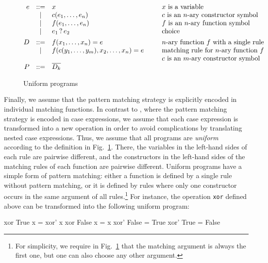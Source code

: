 \documentclass{llncs}
\newcommand{\code}[1]{\mbox{\small\texttt{#1}}}
\newcommand{\Choice}[2]{#1 \mathop{?} #2}
\newcommand{\ol}[1]{\overline{#1}}
\begin{document}
\begin{figure}[t]
\[
\begin{array}{@{}rcl@{~~~~~~~~}l}
  e & ::= & x & \mbox{$x$ is a variable}\\
    &  |  & c(e_1,\ldots,e_n) & \mbox{$c$ is an $n$-ary constructor symbol}\\
    &  |  & f(e_1,\ldots,e_n) & \mbox{$f$ is an $n$-ary function symbol}\\
    &  |  & \Choice{e_1}{e_2} & \mbox{choice} \\[1ex]
  D & ::= & f(x_1,\ldots,x_n) = e
                & \mbox{$n$-ary function $f$ with a single rule}\\
    &  |  & f(c(y_1,\ldots,y_m),x_2,\ldots,x_n) = e
                & \mbox{matching rule for $n$-ary function $f$}\\
    &     & & \mbox{$c$ is an $m$-ary constructor symbol}\\
  P & ::= & \ol{D_k}
\end{array}
\]
\caption{Uniform programs}
\label{fig:uniform}
\end{figure}
%
Finally, we assume that the pattern matching strategy
is explicitly encoded in individual matching functions.
In contrast to \cite{AlbertHanusHuchOliverVidal05},
where the pattern matching strategy is encoded in case expressions,
we assume that each case expression is transformed into
a new operation in order to avoid complications by translating
nested case expressions.
Thus, we assume that all programs are \emph{uniform}
according to the definition in Fig.~\ref{fig:uniform}.
There, %
the variables in the left-hand sides of each rule are pairwise
different, and
the constructors in the left-hand sides of the matching rules of each function
are pairwise different.
Uniform programs have a simple form of pattern matching:
either a function is defined by a single rule without pattern matching,
or it is defined by rules where only one constructor occurs in the same argument
of all rules.\footnote{For simplicity, we require in
Fig.~\ref{fig:uniform} that the matching argument is always the
first one, but one can also choose any other argument.}
For instance, the operation \code{xor} defined above can be transformed
into the following uniform program:
%
\begin{curry}
  xor True   x = xor' x
  xor False  x = x
  xor' False = True
  xor' True  = False
\end{curry}
\end{document}
